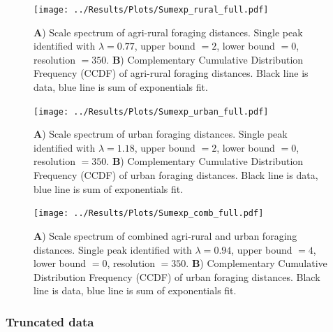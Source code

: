 \documentclass[11pt,usenames,dvipsnames,a4paper]{article}
\begin{document}
\begin{figure}[H]
	\centering
	\texttt{[image: ../Results/Plots/Sumexp\_rural\_full.pdf]}
	\caption{\textbf{A}) Scale spectrum of agri-rural foraging distances. Single peak identified with $\lambda = 0.77$, upper bound $= 2$, lower bound $= 0$, resolution $= 350$. \textbf{B}) Complementary Cumulative Distribution Frequency (CCDF) of agri-rural foraging distances. Black line is data, blue line is sum of exponentials fit.}
\end{figure}

\begin{figure}[H]
	\centering
	\texttt{[image: ../Results/Plots/Sumexp\_urban\_full.pdf]}
	\caption{\textbf{A}) Scale spectrum of urban foraging distances. Single peak identified with $\lambda = 1.18$, upper bound $= 2$, lower bound $= 0$, resolution $= 350$. \textbf{B}) Complementary Cumulative Distribution Frequency (CCDF) of urban foraging distances. Black line is data, blue line is sum of exponentials fit.}
\end{figure}

\begin{figure}[H]
	\centering
	\texttt{[image: ../Results/Plots/Sumexp\_comb\_full.pdf]}
	\caption{\textbf{A}) Scale spectrum of combined agri-rural and urban foraging distances. Single peak identified with $\lambda = 0.94$, upper bound $= 4$, lower bound $= 0$, resolution $= 350$. \textbf{B}) Complementary Cumulative Distribution Frequency (CCDF) of urban foraging distances. Black line is data, blue line is sum of exponentials fit.}
\end{figure}


\subsubsection{Truncated data}
\end{document}
